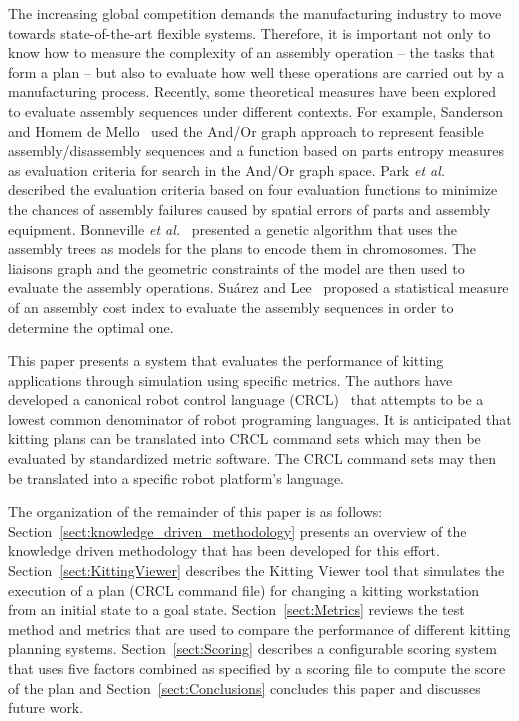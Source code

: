 The increasing global competition demands the manufacturing industry to
move towards state-of-the-art flexible systems. Therefore, it is important
not only to know how to measure the complexity of an assembly operation --
the tasks that form a plan -- but also to evaluate how well these
operations are carried out by a manufacturing process. Recently, some
theoretical measures have been explored to evaluate assembly sequences
under different contexts. For example, Sanderson and Homem de
Mello~\cite{SANDERSON.1987} used the And/Or graph approach to represent
feasible assembly/disassembly sequences and a function based on parts
entropy measures as evaluation criteria for search in the And/Or graph
space. Park \textit{et al.}~\cite{PARK.1991} described the evaluation
criteria based on four evaluation functions to minimize the chances of
assembly failures caused by spatial errors of parts and assembly equipment.
Bonneville \textit{et al.}~\cite{BONNEVILLE.1995} presented a genetic
algorithm that uses the assembly trees as models for the plans to encode
them in chromosomes. The liaisons graph and the geometric constraints of
the model are then used to evaluate the assembly operations. Su\'{a}rez and
Lee~\cite{SUAREZ.1997} proposed a statistical measure of an assembly cost
index to evaluate the assembly sequences in order to determine the optimal
one.


This paper presents a system that evaluates the performance of kitting
applications through simulation using specific metrics. The authors have
developed a canonical robot control language
(CRCL)~\cite{NISTIR.Balakirsky} that attempts to be a lowest common
denominator of robot programing languages. It is anticipated that kitting
plans can be translated into CRCL command sets which may then be evaluated
by standardized metric software. The CRCL command sets may then be
translated into a specific robot platform's language.

The organization of the remainder of this paper is as follows:
Section~\ref{sect:knowledge_driven_methodology} presents an overview of the
knowledge driven methodology that has been developed for this effort.
Section~\ref{sect:KittingViewer} describes the Kitting Viewer tool that
simulates the execution of a plan (CRCL command file) for changing a
kitting workstation from an initial state to a goal state.
Section~\ref{sect:Metrics} reviews the test method and metrics that are
used to compare the performance of different kitting planning systems.
Section~\ref{sect:Scoring} describes a configurable scoring system that
uses five factors combined as specified by a scoring file to compute the
score of the plan and Section~\ref{sect:Conclusions} concludes this paper
and discusses future work.


